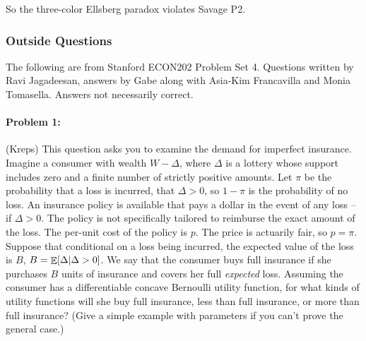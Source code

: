 \documentclass[12pt]{article}
\begin{document}
\begin{enumerate}
	So the three-color Ellsberg paradox violates Savage P2.
\end{enumerate}

\subsubsection{Outside Questions}

The following are from Stanford ECON202 Problem Set 4. Questions written by Ravi Jagadeesan, answers by Gabe along with Asia-Kim Francavilla and Monia Tomasella. Answers not necessarily correct.

\paragraph{Problem 1:} (Kreps) This question asks you to examine the demand for imperfect insurance. Imagine a consumer with wealth $W - \Delta$, where $\Delta$ is a lottery whose support includes zero and a finite number of strictly positive amounts. Let $\pi$ be the probability that a loss is incurred, \ie that $\Delta > 0$, so $1 - \pi$ is the probability of no loss. An insurance policy is available that pays a dollar in the event of any loss -- \ie if $\Delta > 0$. The policy is not specifically tailored to reimburse the exact amount of the loss. The per-unit cost of the policy is $p$. The price is actuarily fair, so $p = \pi$. Suppose that conditional on a loss being incurred, the expected value of the loss is $B$, \ie $B = \mathop{\mathbb{E}}[\Delta | \Delta > 0]$. We say that the consumer buys full insurance if she purchases $B$ units of insurance and covers her full \emph{expected} loss. Assuming the consumer has a differentiable concave Bernoulli utility function, for what kinds of utility functions will she buy full insurance, less than full insurance, or more than full insurance? (Give a simple example with parameters if you can't prove the general case.)

\medskip
\end{document}
